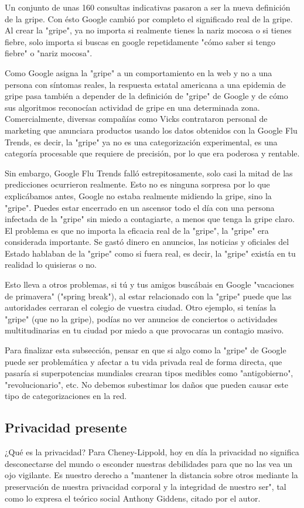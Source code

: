 \documentclass[11pt]{article}
\begin{document}
Un conjunto de unas 160 consultas indicativas pasaron a ser la nueva definición de la gripe. Con ésto Google cambió por completo el significado real de la gripe. Al crear la "gripe", ya no importa si realmente tienes la nariz mocosa o si tienes fiebre, solo importa si buscas en google repetidamente "cómo saber si tengo fiebre" o "nariz mocosa".

Como Google asigna la "gripe" a un comportamiento en la web y no a una persona con síntomas reales, la respuesta estatal americana a una epidemia de gripe pasa también a depender de la definición de "gripe" de Google y de cómo sus algoritmos reconocían actividad de gripe en una determinada zona. Comercialmente, diversas compañías como Vicks contrataron personal de marketing que anunciara productos usando los datos obtenidos con la Google Flu Trends, es decir, la "gripe" ya no es una categorización experimental, es una categoría procesable que requiere de precisión, por lo que era poderosa y rentable.

Sin embargo, Google Flu Trends falló estrepitosamente, solo casi la mitad de las predicciones ocurrieron realmente. Esto no es ninguna sorpresa por lo que explicábamos antes, Google no estaba realmente midiendo la gripe, sino la "gripe". Puedes estar encerrado en un ascensor todo el día con una persona infectada de la "gripe" sin miedo a contagiarte, a menos que tenga la gripe claro. El problema es que no importa la eficacia real de la "gripe", la "gripe" era considerada importante. Se gastó dinero en anuncios, las noticias y oficiales del Estado hablaban de la "gripe" como si fuera real, es decir, la "gripe" existía en tu realidad lo quisieras o no.

Esto lleva a otros problemas, si tú y tus amigos buscábais en Google "vacaciones de primavera" ("spring break"), al estar relacionado con la "gripe" puede que las autoridades cerraran el colegio de vuestra ciudad. Otro ejemplo, si tenías la "gripe" (que no la gripe), podías no ver anuncios de conciertos o actividades multitudinarias en tu ciudad por miedo a que provocaras un contagio masivo.

Para finalizar esta subsección, pensar en que si algo como la "gripe" de Google puede ser problemática y afectar a tu vida privada real de forma directa, que pasaría si superpotencias mundiales crearan tipos medibles como "antigobierno", "revolucionario", etc. No debemos subestimar los daños que pueden causar este tipo de categorizaciones en la red.
\subsection{Privacidad presente}
¿Qué es la privacidad? Para Cheney-Lippold, hoy en día la privacidad no significa desconectarse del mundo o esconder nuestras debilidades para que no las vea un ojo vigilante. Es nuestro derecho a "mantener la distancia sobre otros mediante la preservación de nuestra privacidad corporal y la integridad de nuestro ser", tal como lo expresa el teórico social Anthony Giddens, citado por el autor. 
\end{document}
